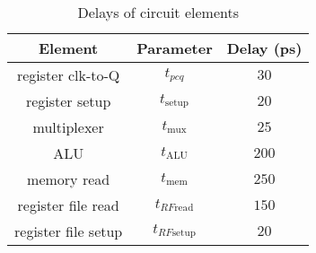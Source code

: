 \documentclass[a4paper]{article}
\begin{document}
	\begin{table}[ht]
	\noindent{}
	\caption{Main decode truth table to mark up with changes}
	\label{tab:dec_truth_table}
	\end{table}

	\begin{table}[ht]
		\centering
		\begin{tabular}{| c c c |}
			\hline
			Element & Parameter & Delay (ps)\\
			\hline
			\hline
			register clk-to-Q & $t_{pcq}$ & $30$ \\
			\hline
			register setup & $t_{\text{setup}}$ & $20$ \\
			\hline
			multiplexer & $t_{\text{mux}}$ & $25$ \\
			\hline
			ALU & $t_{\text{ALU}}$ & $200$ \\
			\hline
			memory read & $t_{\text{mem}}$ & $250$ \\
			\hline
			register file read & $t_{RF\text{read}}$ & $150$\\
			\hline
			register file setup & $t_{RF\text{setup}}$ & $20$ \\
			\hline
		\end{tabular}
		\caption{Delays of circuit elements}
		\label{tab:delays}
	\end{table}
\end{document}
